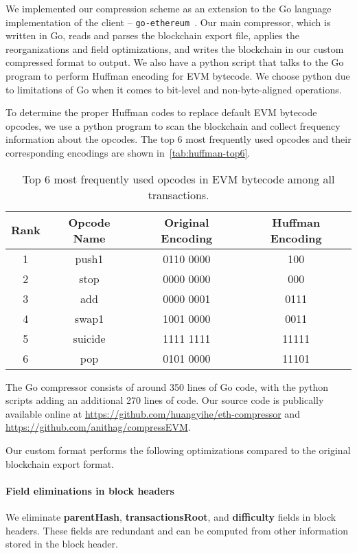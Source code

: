 We implemented our compression scheme as an extension to the Go language implementation of the \eth{} client -- \texttt{go-ethereum}~\cite{go-eth}.
Our main compressor, which is written in Go, reads and parses the blockchain export file,
applies the reorganizations and field optimizations, and writes the blockchain in our custom compressed format to output.
We also have a python script that talks to the Go program to perform Huffman encoding for EVM bytecode.
We choose python due to limitations of Go when it comes to bit-level and non-byte-aligned operations.

To determine the proper Huffman codes to replace default EVM bytecode opcodes, we use a python program to scan the blockchain
and collect frequency information about the opcodes. The top 6 most frequently used opcodes and their corresponding encodings
are shown in~\autoref{tab:huffman-top6}.

\begin{table}[H]
\centering
\begin{tabular}{ c | c | c | c }
	Rank & {Opcode Name} & {Original Encoding} & {Huffman Encoding} \\
\hline
1 & push1   & 0110 0000 & 100\\
2 & stop    & 0000 0000 & 000\\
3 & add     & 0000 0001 & 0111\\
4 & swap1   & 1001 0000 & 0011\\
5 & suicide & 1111 1111 & 11111\\
6 & pop     & 0101 0000 & 11101\\
\end{tabular}
\caption{Top 6 most frequently used opcodes in EVM bytecode among all transactions.}
\label{tab:huffman-top6}
\end{table}

The Go compressor consists of around 350 lines of Go code,
with the python scripts adding an additional 270 lines of code.
Our source code is publically available online at
\url{https://github.com/huangyihe/eth-compressor}
and
\url{https://github.com/anithag/compressEVM}.

Our custom format performs the following optimizations compared to the original blockchain export format.

\paragraph{Field eliminations in block headers} We eliminate \textbf{parentHash}, \textbf{transactionsRoot},
and \textbf{difficulty} fields in block headers. These fields are redundant and can be computed from
other information stored in the block header.

